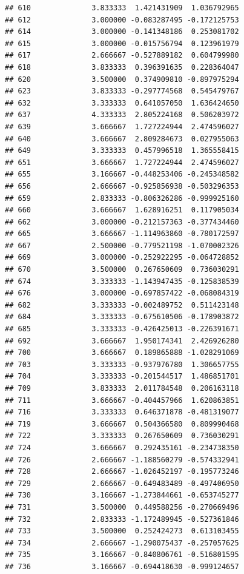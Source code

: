 \documentclass[
]{article}
\begin{document}
\begin{verbatim}
## 610              3.833333  1.421431909  1.036792965
## 612              3.000000 -0.083287495 -0.172125753
## 614              3.000000 -0.141348186  0.253081702
## 615              3.000000 -0.015756794  0.123961979
## 617              2.666667 -0.527889182  0.604799980
## 618              3.833333  0.396391635  0.228364047
## 620              3.500000  0.374909810 -0.897975294
## 623              3.833333 -0.297774568  0.545479767
## 632              3.333333  0.641057050  1.636424650
## 637              4.333333  2.805224168  0.506203972
## 639              3.666667  1.727224944  2.474596027
## 640              3.666667  2.809284673  0.027955063
## 649              3.333333  0.457996518  1.365558415
## 651              3.666667  1.727224944  2.474596027
## 655              3.166667 -0.448253406 -0.245348582
## 656              2.666667 -0.925856938 -0.503296353
## 659              2.833333 -0.806326286 -0.999925160
## 660              3.666667  1.628916251  0.117905034
## 662              3.000000 -0.212157363 -0.377434460
## 665              3.666667 -1.114963860 -0.780172597
## 667              2.500000 -0.779521198 -1.070002326
## 669              3.000000 -0.252922295 -0.064728852
## 670              3.500000  0.267650609  0.736030291
## 674              3.333333 -1.143947435 -0.125838539
## 676              3.000000 -0.697857422 -0.068084319
## 682              3.333333 -0.002489752  0.511423148
## 684              3.333333 -0.675610506 -0.178903872
## 685              3.333333 -0.426425013 -0.226391671
## 692              3.666667  1.950174341  2.426926280
## 700              3.666667  0.189865888 -1.028291069
## 703              3.333333 -0.937976780  1.306657755
## 704              3.333333 -0.201544517  1.486851701
## 709              3.833333  2.011784548  0.206163118
## 711              3.666667 -0.404457966  1.620863851
## 716              3.333333  0.646371878 -0.481319077
## 719              3.666667  0.504366580  0.809990468
## 722              3.333333  0.267650609  0.736030291
## 724              3.666667  0.292435161 -0.234738350
## 726              2.666667 -1.188560279 -0.574332941
## 728              2.666667 -1.026452197 -0.195773246
## 729              2.666667 -0.649483489 -0.497406950
## 730              3.166667 -1.273844661 -0.653745277
## 731              3.500000  0.449588256 -0.270669496
## 732              2.833333 -1.172489945 -0.527361846
## 733              3.500000  0.252424273  0.613103455
## 734              2.666667 -1.290075437 -0.257057625
## 735              3.166667 -0.840806761 -0.516801595
## 736              3.166667 -0.694418630 -0.999124657

\end{verbatim}
\end{document}
